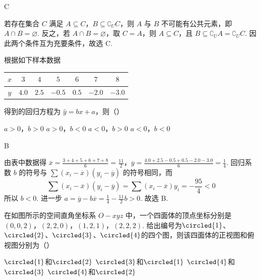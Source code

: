 \begin{answer}
C
\end{answer}

\begin{solution}
若存在集合 \(C\) 满足 \(A\subseteq C\)，\(B\subseteq\complement_U C\)，则 \(A\) 与 \(B\) 不可能有公共元素，即 \(A\cap B=\varnothing\). 反之，若 \(A\cap B=\varnothing\)，取 \(C=A\)，则 \(A\subseteq C\)，且 \(B\subseteq\complement_U A=\complement_U C\). 因此两个条件互为充要条件，故选 C.
\end{solution}

\begin{problem}
根据如下样本数据

\begin{center}
\begin{tabular}{c|cccccc}
\hline
\(x\) & \(3\) & \(4\) & \(5\) & \(6\) & \(7\) & \(8\) \\
\hline
\(y\) & \(4.0\) & \(2.5\) & \(-0.5\) & \(0.5\) & \(-2.0\) & \(-3.0\) \\
\hline
\end{tabular}
\end{center}

得到的回归方程为 \(\hat{y} = bx + a\)，则（\quad）

\choices
    {\(a > 0\)，\(b > 0\)}
    {\(a > 0\)，\(b < 0\)}
    {\(a < 0\)，\(b > 0\)}
    {\(a < 0\)，\(b < 0\)}
\end{problem}

\begin{answer}
B
\end{answer}

\begin{solution}
由表中数据得 \(\overline{x}=\frac{3+4+5+6+7+8}{6}=\frac{11}{2}\)，\(\overline{y}=\frac{4.0+2.5-0.5+0.5-2.0-3.0}{6}=\frac14\). 回归系数 \(b\) 的符号与 \(\sum (x_i-\overline{x})(y_i-\overline{y})\) 的符号相同，而
\[
\sum (x_i-\overline{x})(y_i-\overline{y})=\sum (x_i-\overline{x})y_i=-\frac{95}{4}<0
\]
所以 \(b<0\). 进一步 \(a=\overline{y}-b\overline{x}=\frac14-\frac{11}{2}b>0\). 故选 B.
\end{solution}

\begin{problem}
在如图所示的空间直角坐标系 \(O-xyz\) 中，一个四面体的顶点坐标分别是 \((0,0,2)\)，\((2,2,0)\)，\((1,2,1)\)，\((2,2,2)\). 给出编号为\(\circled{1}\)、\(\circled{2}\)、\(\circled{3}\)、\(\circled{4}\)的四个图，则该四面体的正视图和俯视图分别为（\quad）


\choices
    {\(\circled{1}\)和\(\circled{2}\)}
    {\(\circled{3}\)和\(\circled{1}\)}
    {\(\circled{4}\)和\(\circled{3}\)}
    {\(\circled{4}\)和\(\circled{2}\)}
\end{problem}

